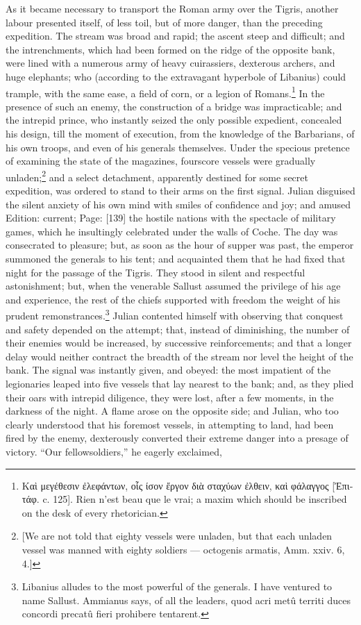As it became necessary to transport the Roman army over the Tigris, another labour presented itself, of less toil, but of more danger, than the preceding expedition. The stream was broad and rapid; the ascent steep and difficult; and the intrenchments, which had been formed on the ridge of the opposite bank, were lined with a numerous army of heavy cuirassiers, dexterous archers, and huge elephants; who (according to the extravagant hyperbole of Libanius) could trample, with the same ease, a field of corn, or a legion of Romans.\footnote{\textgreek{Κα\texthebrew{ὶ} μεγέθεσιν \texthebrew{ἐ}λεφάντων, ο\texthebrew{ἷ}ς ίσον \texthebrew{ἔ}ργον δι\texthebrew{ὰ} σταχύων \texthebrew{ἐ}λθειν, κα\texthebrew{ὶ} φάλαγγος} [\textgreek{\texthebrew{Ἐ}πιτάφ}. c. 125]. Rien n\texthebrew{}’est beau que le vrai; a maxim which should be inscribed on the desk of every rhetorician.} In the presence of such an enemy, the construction of a bridge was impracticable; and the intrepid prince, who instantly seized the only possible expedient, concealed his design, till the moment of execution, from the knowledge of the Barbarians, of his own troops, and even of his generals themselves. Under the specious pretence of examining the state of the magazines, fourscore vessels were gradually unladen;\footnote{[We are not told that eighty vessels were unladen, but that each unladen vessel was manned with eighty soldiers \texthebrew{—} octogenis armatis, Amm. xxiv. 6, 4.]} and a select detachment, apparently destined for some secret expedition, was ordered to stand to their arms on the first signal. Julian disguised the silent anxiety of his own mind with smiles of confidence and joy; and amused Edition: current; Page: [139] the hostile nations with the spectacle of military games, which he insultingly celebrated under the walls of Coche. The day was consecrated to pleasure; but, as soon as the hour of supper was past, the emperor summoned the generals to his tent; and acquainted them that he had fixed that night for the passage of the Tigris. They stood in silent and respectful astonishment; but, when the venerable Sallust assumed the privilege of his age and experience, the rest of the chiefs supported with freedom the weight of his prudent remonstrances.\footnote{Libanius alludes to the most powerful of the generals. I have ventured to name Sallust. Ammianus says, of all the leaders, quod acri metû territi duces concordi precatû fieri prohibere tentarent.} Julian contented himself with observing that conquest and safety depended on the attempt; that, instead of diminishing, the number of their enemies would be increased, by successive reinforcements; and that a longer delay would neither contract the breadth of the stream nor level the height of the bank. The signal was instantly given, and obeyed: the most impatient of the legionaries leaped into five vessels that lay nearest to the bank; and, as they plied their oars with intrepid diligence, they were lost, after a few moments, in the darkness of the night. A flame arose on the opposite side; and Julian, who too clearly understood that his foremost vessels, in attempting to land, had been fired by the enemy, dexterously converted their extreme danger into a presage of victory. \texthebrew{“}Our fellowsoldiers,\texthebrew{}” he eagerly exclaimed, 